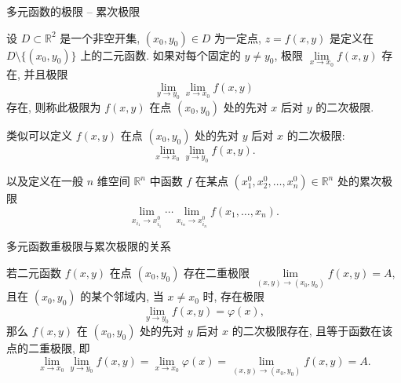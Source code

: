 \begin{frame}{多元函数的极限 -- 累次极限}

\begin{Def}[二次极限]
设 $D \subset \mathbb{R}^2$ 是一个非空开集, $(x_0, y_0) \in D$ 为一定点, $z = f(x, y)$ 是定义在 $D \setminus \{(x_0, y_0)\}$ 上的二元函数.
如果对{\color{red}每个固定的 $y\neq y_0$}, 极限 $\lim\limits_{x \to x_0} f(x, y)$ 存在, 并且极限
\[\lim_{y \to y_0} \lim_{x \to x_0} f(x, y)\]
存在, 则称此极限为 $f(x, y)$ 在点 $(x_0, y_0)$ 处的先对 $x$ 后对 $y$ 的二次极限.
\end{Def}

\pause

类似可以定义 $f(x, y)$ 在点 $(x_0, y_0)$ 处的先对 $y$ 后对 $x$ 的二次极限:
\[\lim_{x \to x_0} \lim_{y \to y_0} f(x, y).\]

\pause
\vspace{0.5em}

以及定义在一般 $n$ 维空间 $\mathbb{R}^n$ 中函数 $f$ 在某点 $(x_1^0, x_2^0, \dots, x_n^0) \in \mathbb{R}^n$ 处的累次极限
\[\lim_{x_{i_1} \to x_{i_1}^0} \cdots \lim_{x_{i_n} \to x_{i_n}^0} f(x_1, \dots, x_n).\]

\end{frame}


\begin{frame}{多元函数重极限与累次极限的关系}

\begin{thm}
若二元函数 $f(x, y)$ 在点 $(x_0, y_0)$ 存在二重极限 $\lim\limits_{(x,y) \to (x_0, y_0)} f(x, y) = A$, 且在 $(x_0, y_0)$ 的某个邻域内, 当 $x \neq x_0$ 时, 存在极限
\[\lim_{y \to y_0} f(x, y) = \varphi(x),\]
那么 $f(x, y)$ 在 $(x_0, y_0)$ 处的先对 $y$ 后对 $x$ 的二次极限存在, 且等于函数在该点的二重极限, 即
\[\lim_{x \to x_0} \lim_{y \to y_0} f(x, y) = \lim_{x \to x_0} \varphi(x) = \lim_{(x,y) \to (x_0, y_0)} f(x, y) = A.\]
\end{thm}

\end{frame}


